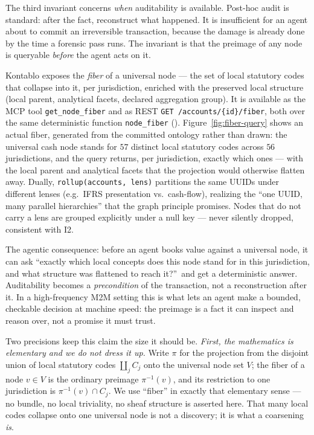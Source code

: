 \documentclass[11pt]{clapps}  %
\begin{document}
The third invariant concerns \emph{when} auditability is available. Post-hoc
audit is standard: after the fact, reconstruct what happened. It is insufficient
for an agent about to commit an irreversible transaction, because the damage is
already done by the time a forensic pass runs. The invariant is that the
preimage of any node is queryable \emph{before} the agent acts on it.

Kontablo exposes the \emph{fiber} of a universal node --- the set of local
statutory codes that collapse into it, per jurisdiction, enriched with the
preserved local structure (local parent, analytical facets, declared
aggregation group). It is available as the MCP tool \texttt{get\_node\_fiber}
and as REST \texttt{GET /accounts/\{id\}/fiber}, both over the same
deterministic function \texttt{node\_fiber} ().
Figure~\ref{fig:fiber-query} shows an actual fiber, generated from the committed
ontology rather than drawn: the universal cash node stands for $57$ distinct
local statutory codes across $56$ jurisdictions, and the query returns, per
jurisdiction, exactly which ones --- with the local parent and analytical facets
that the projection would otherwise flatten away.
Dually, \texttt{rollup(accounts, lens)} partitions the same UUIDs under
different lenses (e.g.\ IFRS presentation vs.\ cash-flow), realizing the ``one
UUID, many parallel hierarchies'' that the graph principle promises. Nodes that
do not carry a lens are grouped explicitly under a null key --- never silently
dropped, consistent with I2.

The agentic consequence: before an agent books value against a universal node,
it can ask ``exactly which local concepts does this node stand for in this
jurisdiction, and what structure was flattened to reach it?''\ and get a
deterministic answer. Auditability becomes a \emph{precondition} of the
transaction, not a reconstruction after it. In a high-frequency M2M setting this
is what lets an agent make a bounded, checkable decision at machine speed:
the preimage is a fact it can inspect and reason over, not a promise it must
trust.

Two precisions keep this claim the size it should be. \emph{First, the
mathematics is elementary and we do not dress it up.} Write $\pi$ for the
projection from the disjoint union of local statutory codes
$\coprod_{j} C_{j}$ onto the universal node set $V$; the fiber of a node
$v \in V$ is the ordinary preimage $\pi^{-1}(v)$, and its restriction to one
jurisdiction is $\pi^{-1}(v) \cap C_{j}$. We use ``fiber'' in exactly that
elementary sense --- no bundle, no local triviality, no sheaf structure is
asserted here. That many local codes collapse onto one universal node is not a
discovery; it is what a coarsening \emph{is}.
\end{document}
